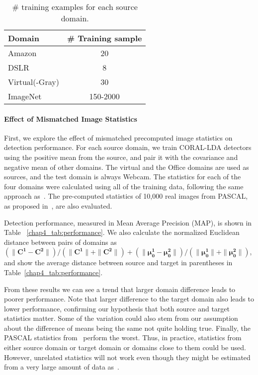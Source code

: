 \documentclass[graybox]{svmult}
\newcommand\mat[1]{\mathbf{#1}}
\renewcommand\vec[1]{\mathbf{#1}}
\begin{document}
\begin{table}
\centering
\begin{small}
\begin{tabular}{|l|c|}
\hline
Domain & \# Training sample  \\
\hline \hline
Amazon & 20 \\ \hline
DSLR   & 8  \\ \hline
Virtual(-Gray) & 30 \\ \hline
ImageNet & 150-2000 \\
\hline
\end{tabular}
\caption{\small \# training examples for each source domain.}
\label{chap4_tab:ntrain}
\end{small}
\end{table}

\paragraph{\textbf{Effect of Mismatched Image Statistics}}
First, we explore the effect of mismatched precomputed image statistics on detection performance.
For each source domain, we train CORAL-LDA detectors using the positive mean from the source, and pair it with the covariance and negative mean of other domains. The virtual and the Office domains are used as sources, and the test domain is always Webcam. 
The statistics for each of the four domains were calculated using all of the training data,
following the same approach as~\cite{who}. The pre-computed statistics of 10,000 real images from PASCAL, as proposed in~\cite{who,ICRA14}, are also evaluated.

Detection performance, measured in Mean Average Precision (MAP), is shown in Table ~\ref{chap4_tab:performance}. We also calculate the normalized Euclidean distance between pairs of domains as $ (\|\mat{C^1} - \mat{C^2} \|) / (\|\mat{C^1}\|+\|\mat{C^2}\|) + (\|\vec{\mu_{0}^1}-\vec{\mu_{0}^2} \|) / (\| \vec{\mu_0^1}\| + \| \vec{\mu_0^2} \|) $, and show the average distance between source and target in parentheses in Table~\ref{chap4_tab:performance}.

From these results we can see a trend that larger domain difference leads to poorer performance. Note that larger difference to the target domain also leads to lower performance, confirming our hypothesis that both source and target statistics matter. Some of the variation could also stem from our assumption about the difference of means being the same not quite holding true. Finally, the PASCAL statistics from~\cite{who} perform the worst. Thus, in practice, statistics from either source domain or target domain or domains close to them could be used. However, unrelated statistics will not work even though they might be estimated from a very large amount of data as~\cite{who}. 
\end{document}
